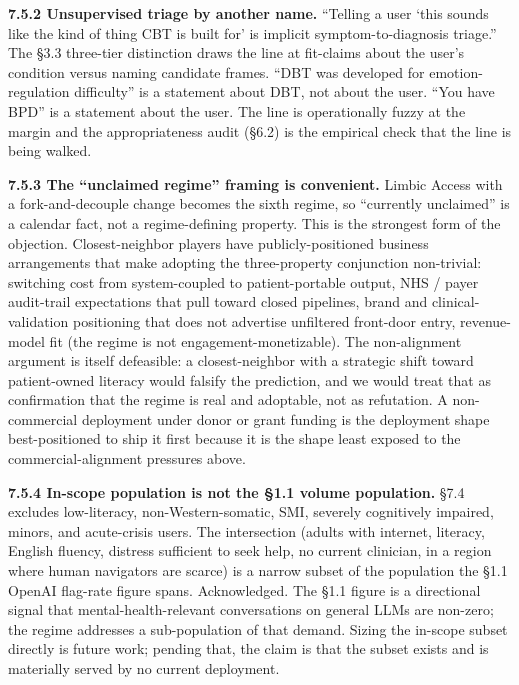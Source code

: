 \documentclass[letterpaper]{article}
\begin{document}
\textbf{7.5.2 Unsupervised triage by another name.} ``Telling a user `this sounds like the kind of thing CBT is built for' is implicit symptom-to-diagnosis triage.'' The \S3.3 three-tier distinction draws the line at fit-claims about the user's condition versus naming candidate frames. ``DBT was developed for emotion-regulation difficulty'' is a statement about DBT, not about the user. ``You have BPD'' is a statement about the user. The line is operationally fuzzy at the margin and the appropriateness audit (\S6.2) is the empirical check that the line is being walked.

\textbf{7.5.3 The ``unclaimed regime'' framing is convenient.} Limbic Access with a fork-and-decouple change becomes the sixth regime, so ``currently unclaimed'' is a calendar fact, not a regime-defining property. This is the strongest form of the objection. Closest-neighbor players have publicly-positioned business arrangements that make adopting the three-property conjunction non-trivial: switching cost from system-coupled to patient-portable output, NHS / payer audit-trail expectations that pull toward closed pipelines, brand and clinical-validation positioning that does not advertise unfiltered front-door entry, revenue-model fit (the regime is not engagement-monetizable). The non-alignment argument is itself defeasible: a closest-neighbor with a strategic shift toward patient-owned literacy would falsify the prediction, and we would treat that as confirmation that the regime is real and adoptable, not as refutation. A non-commercial deployment under donor or grant funding is the deployment shape best-positioned to ship it first because it is the shape least exposed to the commercial-alignment pressures above.

\textbf{7.5.4 In-scope population is not the \S1.1 volume population.} \S7.4 excludes low-literacy, non-Western-somatic, SMI, severely cognitively impaired, minors, and acute-crisis users. The intersection (adults with internet, literacy, English fluency, distress sufficient to seek help, no current clinician, in a region where human navigators are scarce) is a narrow subset of the population the \S1.1 OpenAI flag-rate figure spans. Acknowledged. The \S1.1 figure is a directional signal that mental-health-relevant conversations on general LLMs are non-zero; the regime addresses a sub-population of that demand. Sizing the in-scope subset directly is future work; pending that, the claim is that the subset exists and is materially served by no current deployment.
\end{document}
